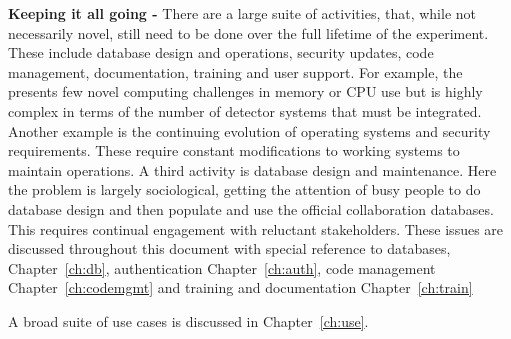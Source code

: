 \documentclass[../main-v1.tex]{subfiles}
\begin{document}
\begin{description}
\item{\bf Keeping it all going -}  %
There are a large suite of activities, that,  %
while not necessarily novel, %
still need to be done over the full lifetime of the experiment.  These include database design and operations, security updates, code management, documentation, training and user support.   For example, the  presents few novel computing challenges in memory or CPU use but is highly complex in terms of the number of detector systems that must be integrated. Another example is the continuing evolution of operating systems and security requirements.  These require constant modifications to working systems to maintain operations.  A third activity is database design and maintenance. Here the problem is largely sociological, getting the attention of busy people to do database design and then %
populate and use the official collaboration databases. This requires continual engagement with reluctant stakeholders. These issues are discussed throughout this document with special reference to databases, Chapter~\ref{ch:db}, authentication Chapter~\ref{ch:auth}, code management Chapter~\ref{ch:codemgmt} and training and documentation Chapter~\ref{ch:train}
\end{description}
A broad suite of use cases is discussed in Chapter~\ref{ch:use}.


\end{document}
